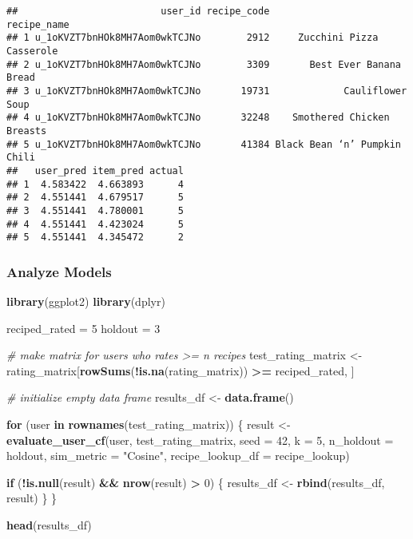 \documentclass[
]{article}
\newenvironment{Shaded}{\begin{snugshade}}{\end{snugshade}}
\newcommand{\AttributeTok}[1]{\textcolor[rgb]{0.13,0.29,0.53}{#1}}
\newcommand{\CommentTok}[1]{\textcolor[rgb]{0.56,0.35,0.01}{\textit{#1}}}
\newcommand{\ControlFlowTok}[1]{\textcolor[rgb]{0.13,0.29,0.53}{\textbf{#1}}}
\newcommand{\DecValTok}[1]{\textcolor[rgb]{0.00,0.00,0.81}{#1}}
\newcommand{\FunctionTok}[1]{\textcolor[rgb]{0.13,0.29,0.53}{\textbf{#1}}}
\newcommand{\NormalTok}[1]{#1}
\newcommand{\OtherTok}[1]{\textcolor[rgb]{0.56,0.35,0.01}{#1}}
\newcommand{\SpecialCharTok}[1]{\textcolor[rgb]{0.81,0.36,0.00}{\textbf{#1}}}
\newcommand{\StringTok}[1]{\textcolor[rgb]{0.31,0.60,0.02}{#1}}
\begin{document}
\begin{verbatim}
##                         user_id recipe_code                  recipe_name
## 1 u_1oKVZT7bnHOk8MH7Aom0wkTCJNo        2912     Zucchini Pizza Casserole
## 2 u_1oKVZT7bnHOk8MH7Aom0wkTCJNo        3309       Best Ever Banana Bread
## 3 u_1oKVZT7bnHOk8MH7Aom0wkTCJNo       19731             Cauliflower Soup
## 4 u_1oKVZT7bnHOk8MH7Aom0wkTCJNo       32248    Smothered Chicken Breasts
## 5 u_1oKVZT7bnHOk8MH7Aom0wkTCJNo       41384 Black Bean ‘n’ Pumpkin Chili
##   user_pred item_pred actual
## 1  4.583422  4.663893      4
## 2  4.551441  4.679517      5
## 3  4.551441  4.780001      5
## 4  4.551441  4.423024      5
## 5  4.551441  4.345472      2
\end{verbatim}

\subsubsection{Analyze Models}\label{analyze-models}

\begin{Shaded}
\begin{Highlighting}[]
\FunctionTok{library}\NormalTok{(ggplot2)}
\FunctionTok{library}\NormalTok{(dplyr)}

\NormalTok{reciped\_rated }\OtherTok{=} \DecValTok{5}
\NormalTok{holdout }\OtherTok{=} \DecValTok{3}

\CommentTok{\# make matrix for users who rates \textgreater{}= n recipes}
\NormalTok{test\_rating\_matrix }\OtherTok{\textless{}{-}}\NormalTok{ rating\_matrix[}\FunctionTok{rowSums}\NormalTok{(}\SpecialCharTok{!}\FunctionTok{is.na}\NormalTok{(rating\_matrix)) }\SpecialCharTok{\textgreater{}=}\NormalTok{ reciped\_rated, ]}

\CommentTok{\# initialize empty data frame}
\NormalTok{results\_df }\OtherTok{\textless{}{-}} \FunctionTok{data.frame}\NormalTok{()  }

\ControlFlowTok{for}\NormalTok{ (user }\ControlFlowTok{in} \FunctionTok{rownames}\NormalTok{(test\_rating\_matrix)) \{}
\NormalTok{  result }\OtherTok{\textless{}{-}} \FunctionTok{evaluate\_user\_cf}\NormalTok{(user, test\_rating\_matrix, }\AttributeTok{seed =} \DecValTok{42}\NormalTok{, }\AttributeTok{k =} \DecValTok{5}\NormalTok{, }
                             \AttributeTok{n\_holdout =}\NormalTok{ holdout, }\AttributeTok{sim\_metric =} \StringTok{"Cosine"}\NormalTok{, }
                             \AttributeTok{recipe\_lookup\_df =}\NormalTok{ recipe\_lookup)}
  
  \ControlFlowTok{if}\NormalTok{ (}\SpecialCharTok{!}\FunctionTok{is.null}\NormalTok{(result) }\SpecialCharTok{\&\&} \FunctionTok{nrow}\NormalTok{(result) }\SpecialCharTok{\textgreater{}} \DecValTok{0}\NormalTok{) \{}
\NormalTok{    results\_df }\OtherTok{\textless{}{-}} \FunctionTok{rbind}\NormalTok{(results\_df, result)}
\NormalTok{  \}}
\NormalTok{\}}

\FunctionTok{head}\NormalTok{(results\_df)}
\end{Highlighting}
\end{Shaded}
\end{document}
